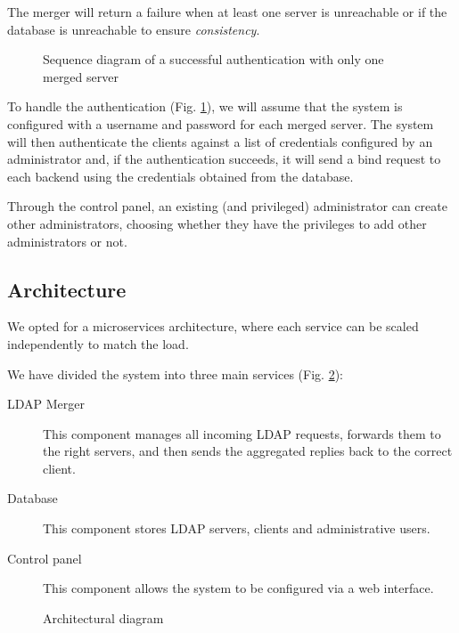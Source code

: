 \documentclass{scrartcl}
\begin{document}
\par The merger will return a failure when at least one server is unreachable or if the database is unreachable to ensure \textit{consistency}.
\begin{figure}[h]
    \centering
    
    \caption{Sequence diagram of a successful authentication with only one merged server}
    \label{fig:auth} 
\end{figure}
\par To handle the authentication (Fig. \ref{fig:auth}), we will assume that the system is configured with a username
and password for each merged server. The system will then authenticate the clients against a list of credentials configured
by an administrator and, if the authentication succeeds, it will send a bind request to each backend using the credentials
obtained from the database.
\par Through the control panel, an existing (and privileged) administrator can create other administrators, choosing whether
they have the privileges to add other administrators or not.

\subsection{Architecture}

\par We opted for a microservices architecture, where each service can be scaled independently to match the load.
\par We have divided the system into three main services (Fig. \ref{fig:arch}):
\begin{description}
    \item[LDAP Merger] This component manages all incoming LDAP requests, forwards them to the right servers, and then sends the aggregated replies back to the correct client.
    \item[Database] This component stores LDAP servers, clients and administrative users.
    \item[Control panel] This component allows the system to be configured via a web interface.
\end{description}

\begin{figure}
    \centering
    
    \caption{Architectural diagram}
    \label{fig:arch} 
\end{figure}
\end{document}
